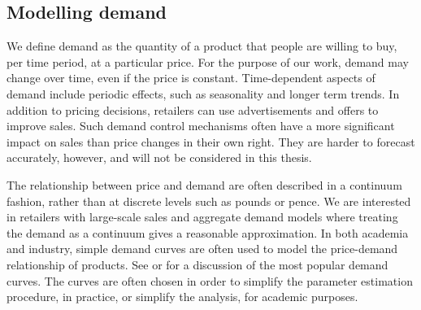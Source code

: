 \documentclass[main.tex]{subfiles}
\begin{document}
\subsection{Modelling demand}\label{sec:intro_model_demand}
We define demand as the quantity of a product that people are willing
to buy, per time period, at a particular price. For the purpose of our
work, demand may change over time, even if the price is constant.
Time-dependent aspects of demand include periodic effects, such as
seasonality and longer term trends.
In addition to pricing decisions, retailers can use advertisements and
offers to improve sales. Such demand control mechanisms often have a
more significant impact on sales than price changes in their own
right. They are harder to forecast accurately, however, and will not
be considered in this thesis.

The relationship between price and demand are often described in a
continuum fashion, rather than at discrete levels such as pounds or
pence. We are interested in retailers with large-scale sales and
aggregate demand models where treating the demand as a continuum gives
a reasonable approximation.
In both academia and industry, simple demand curves are often used to
model the price-demand relationship of
products. See \citet[Ch.~7.3]{talluri2006theory} or \citet{phillips2005pricing}
for a discussion of the most popular demand curves. The curves are often
chosen in order to simplify the parameter
estimation procedure, in practice, or simplify the analysis, for academic purposes.
\end{document}
